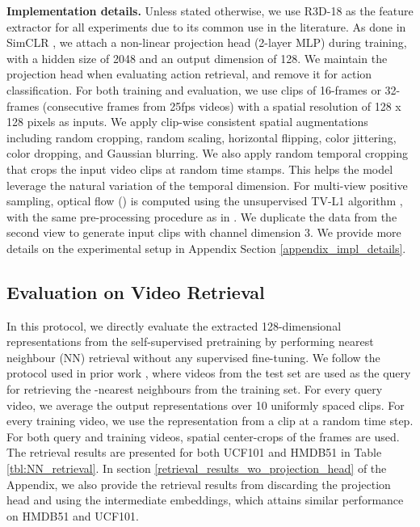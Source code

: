 \documentclass[10pt,twocolumn,letterpaper]{article}
\begin{document}
\textbf{Implementation details.} Unless stated otherwise, we use R3D-18 \cite{hara2018spatiotemporal} as the feature extractor for all experiments due to its common use in the literature. As done in SimCLR \cite{chen2020simple}, we attach a non-linear projection head (2-layer MLP) during training, with a hidden size of 2048 and an output dimension of 128. We maintain the projection head when evaluating action retrieval, and remove it for action classification. For both training and evaluation, we use clips of 16-frames or 32-frames (consecutive frames from 25fps videos) with a spatial resolution of 128 x 128 pixels as inputs. We apply clip-wise consistent spatial augmentations including random cropping, random scaling, horizontal flipping, color jittering, color dropping, and Gaussian blurring. We also apply random temporal cropping that crops the input video clips at random time stamps. This helps the model leverage the natural variation of the temporal dimension. For multi-view positive sampling, optical flow () is computed using the unsupervised TV-L1 algorithm \cite{zach2007tvl1}, with the same pre-processing procedure as in \cite{carreira2017i3d}. We duplicate the data from the second view to generate input clips with channel dimension 3. We provide more details on the experimental setup in Appendix Section \ref{appendix_impl_details}.





\subsection{Evaluation on Video Retrieval}
\vspace{-0.1cm}

\label{video_retrieval}
In this protocol, we directly evaluate the extracted 128-dimensional representations from the self-supervised pretraining by performing nearest neighbour (NN) retrieval without any supervised fine-tuning. We follow the protocol used in prior work \cite{dave2021tclr,coclr,VCP,VCOP,Han20}, where videos from the test set are used as the query for retrieving the -nearest neighbours from the training set. For every query video, we average the output representations over 10 uniformly spaced clips. For every training video, we use the representation from a clip at a random time step. For both query and training videos, spatial center-crops of the frames are used. The retrieval results are presented for both UCF101 and HMDB51 in Table \ref{tbl:NN_retrieval}. In section \ref{retrieval_results_wo_projection_head} of the Appendix, we also provide the retrieval results from discarding the projection head and using the intermediate embeddings, which attains similar performance on HMDB51 and UCF101.
\end{document}
